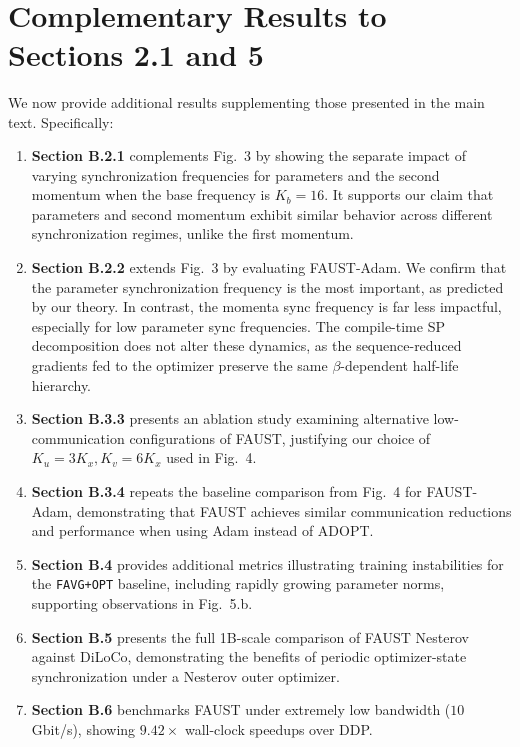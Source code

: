 \documentclass{article}
\begin{document}
\
\section{Complementary Results to Sections 2.1 and 5}
\label{sec:complementary}
\label{sec:critical_batch}

We now provide additional results supplementing those presented in the main text. Specifically:

\begin{enumerate}
\item \textbf{Section B.2.1} complements Fig.~3 by showing the separate impact of varying synchronization frequencies for parameters and the second momentum when the base frequency is $K_b=16$. It supports our claim that parameters and second momentum exhibit similar behavior across different synchronization regimes, unlike the first momentum.
\item \textbf{Section B.2.2} extends Fig.~3 by evaluating FAUST-Adam. We confirm that the parameter synchronization frequency is the most important, as predicted by our theory. In contrast, the momenta sync frequency is far less impactful, especially for low parameter sync frequencies. The compile-time SP decomposition does not alter these dynamics, as the sequence-reduced gradients fed to the optimizer preserve the same $\beta$-dependent half-life hierarchy.
\item \textbf{Section B.3.3} presents an ablation study examining alternative low-communication configurations of FAUST, justifying our choice of $K_u=3K_x, K_v=6K_x$ used in Fig.~4.
\item \textbf{Section B.3.4} repeats the baseline comparison from Fig.~4 for FAUST-Adam, demonstrating that FAUST achieves similar communication reductions and performance when using Adam instead of ADOPT.
\item \textbf{Section B.4} provides additional metrics illustrating training instabilities for the \texttt{FAVG+OPT} baseline, including rapidly growing parameter norms, supporting observations in Fig.~5.b.
\item \textbf{Section B.5} presents the full 1B-scale comparison of FAUST Nesterov against DiLoCo, demonstrating the benefits of periodic optimizer-state synchronization under a Nesterov outer optimizer.
\item \textbf{Section B.6} benchmarks FAUST under extremely low bandwidth ($10$ Gbit/s), showing $9.42\times$ wall-clock speedups over DDP.
\end{enumerate}
\end{document}
